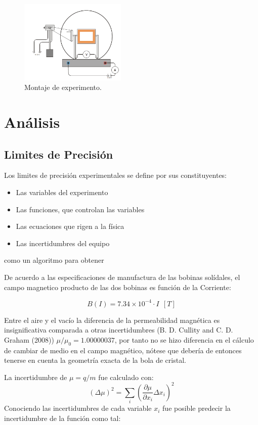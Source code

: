 \documentclass[a4paper,twocolumn,10pt]{article}
\begin{document}
\begin{figure}[H]
    \centering
    \includegraphics[width=0.45\textwidth]{Imagenes/QM/montajebola.png}
    \caption{Montaje de experimento.}
    \label{fig:montaje_bola}
\end{figure}




\section{Análisis}
\subsection{Limites de Precisión}
Los limites de precisión experimentales se define por sus constituyentes:
\begin{itemize}
    \item Las variables del experimento
    \item Las funciones, que controlan las variables
    \item Las ecuaciones que rigen a la física
    \item Las incertidumbres del equipo
\end{itemize}
como un algoritmo para obtener 

De acuerdo a las especificaciones de manufactura de las bobinas solídales, el campo magnetico producto de las dos bobinas es función de la Corriente:

$$ B(I) = 7.34  \times 10^{-4} \cdot I \:\:[T]$$

Entre el aire y el vacío la diferencia de la permeabilidad magnética es insignificativa comparada a otras incertidumbres (B. D. Cullity and C. D. Graham (2008)) $\mu/\mu_0 = 1.00000037$, por tanto no se hizo diferencia en el cálculo de cambiar de medio en el campo magnético, nótese que debería de entonces tenerse en cuenta la geometría exacta de la bola de cristal.

La incertidumbre de $\mu = q/m$ fue calculado con:
$$
(\Delta \mu)^2 = \sum_i (\frac{\partial \mu}{\partial x_i} \Delta x_i)^2
$$
Conociendo las incertidumbres de cada variable $x_i$ fue posible predecir la incertidumbre de la función como tal:
\end{document}
